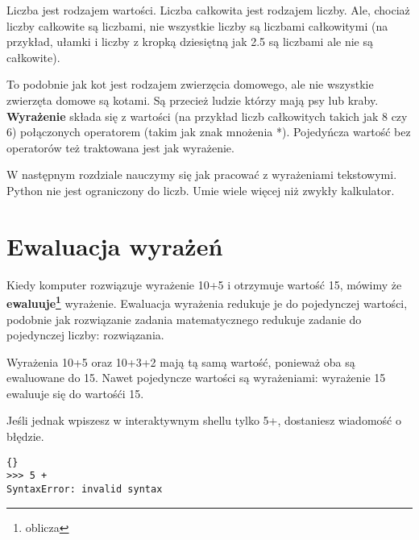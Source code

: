 \documentclass{book}
\begin{document}
Liczba jest rodzajem wartości. Liczba całkowita jest rodzajem liczby. Ale, chociaż liczby całkowite są liczbami, nie wszystkie liczby są liczbami całkowitymi (na przykład, ułamki i liczby z kropką dziesiętną jak 2.5 są liczbami ale nie są całkowite).

To podobnie jak kot jest rodzajem zwierzęcia domowego, ale nie wszystkie zwierzęta domowe są kotami. Są przecież ludzie którzy mają psy lub kraby. {\bf Wyrażenie} składa się z wartości (na przykład liczb całkowitych takich jak 8 czy 6) połączonych operatorem (takim jak znak mnożenia *). Pojedyńcza wartość bez operatorów też traktowana jest jak wyrażenie.

W następnym rozdziale nauczymy się jak pracować z wyrażeniami tekstowymi. Python nie jest ograniczony do liczb. Umie wiele więcej niż zwykły kalkulator.

\section{Ewaluacja wyrażeń}

Kiedy komputer rozwiązuje wyrażenie 10+5 i otrzymuje wartość 15, mówimy że {\bf ewaluuje\footnote{oblicza}} wyrażenie. Ewaluacja wyrażenia redukuje je do pojedynczej wartości, podobnie jak rozwiązanie zadania matematycznego redukuje zadanie do pojedynczej liczby: rozwiązania.

Wyrażenia 10+5 oraz 10+3+2 mają tą samą wartość, ponieważ oba są ewaluowane do 15. Nawet pojedyncze wartości są wyrażeniami: wyrażenie 15 ewaluuje się do wartośći 15.

Jeśli jednak wpiszesz w interaktywnym shellu tylko 5+, dostaniesz wiadomość o błędzie.
\lstset{language=python}
\begin{lstlisting}{}
>>> 5 +
SyntaxError: invalid syntax
\end{lstlisting}
\end{document}
